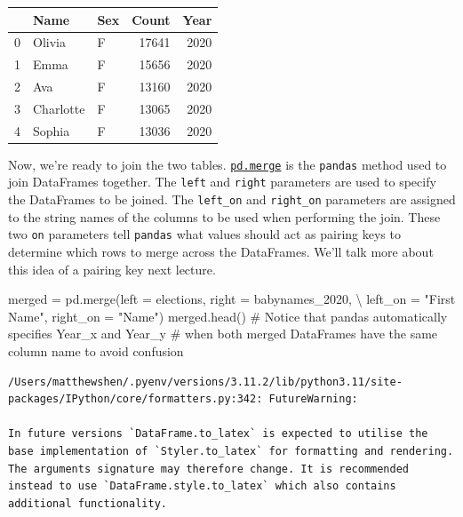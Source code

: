 \documentclass[
  letterpaper,
  DIV=11,
  numbers=noendperiod]{scrreprt}
\newenvironment{Shaded}{\begin{snugshade}}{\end{snugshade}}
\newcommand{\CommentTok}[1]{\textcolor[rgb]{0.37,0.37,0.37}{#1}}
\newcommand{\NormalTok}[1]{\textcolor[rgb]{0.00,0.23,0.31}{#1}}
\newcommand{\OperatorTok}[1]{\textcolor[rgb]{0.37,0.37,0.37}{#1}}
\newcommand{\StringTok}[1]{\textcolor[rgb]{0.13,0.47,0.30}{#1}}
\begin{document}
\begin{tabular}{lllrr}
\toprule
{} &       Name & Sex &  Count &  Year \\
\midrule
0 &     Olivia &   F &  17641 &  2020 \\
1 &       Emma &   F &  15656 &  2020 \\
2 &        Ava &   F &  13160 &  2020 \\
3 &  Charlotte &   F &  13065 &  2020 \\
4 &     Sophia &   F &  13036 &  2020 \\
\bottomrule
\end{tabular}

Now, we're ready to join the two tables.
\href{https://pandas.pydata.org/docs/reference/api/pandas.DataFrame.merge.html}{\texttt{pd.merge}}
is the \texttt{pandas} method used to join DataFrames together. The
\texttt{left} and \texttt{right} parameters are used to specify the
DataFrames to be joined. The \texttt{left\_on} and \texttt{right\_on}
parameters are assigned to the string names of the columns to be used
when performing the join. These two \texttt{on} parameters tell
\texttt{pandas} what values should act as pairing keys to determine
which rows to merge across the DataFrames. We'll talk more about this
idea of a pairing key next lecture.

\begin{Shaded}
\begin{Highlighting}[]
\NormalTok{merged }\OperatorTok{=}\NormalTok{ pd.merge(left }\OperatorTok{=}\NormalTok{ elections, right }\OperatorTok{=}\NormalTok{ babynames\_2020, }\OperatorTok{\textbackslash{}}
\NormalTok{                  left\_on }\OperatorTok{=} \StringTok{"First Name"}\NormalTok{, right\_on }\OperatorTok{=} \StringTok{"Name"}\NormalTok{)}
\NormalTok{merged.head()}
\CommentTok{\# Notice that pandas automatically specifies \textasciigrave{}Year\_x\textasciigrave{} and \textasciigrave{}Year\_y\textasciigrave{} }
\CommentTok{\# when both merged DataFrames have the same column name to avoid confusion}
\end{Highlighting}
\end{Shaded}

\begin{verbatim}
/Users/matthewshen/.pyenv/versions/3.11.2/lib/python3.11/site-packages/IPython/core/formatters.py:342: FutureWarning:

In future versions `DataFrame.to_latex` is expected to utilise the base implementation of `Styler.to_latex` for formatting and rendering. The arguments signature may therefore change. It is recommended instead to use `DataFrame.style.to_latex` which also contains additional functionality.
\end{verbatim}
\end{document}
